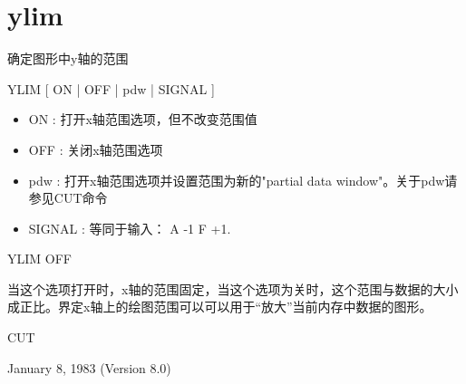 \section{ylim}
\label{cmd:ylim}

确定图形中y轴的范围

YLIM [ ON | OFF | pdw | SIGNAL ]

\begin{itemize}
\item ON : 打开x轴范围选项，但不改变范围值 
\item OFF : 关闭x轴范围选项 
\item pdw : 打开x轴范围选项并设置范围为新的"partial data window"。关于pdw请参见CUT命令 
\item SIGNAL : 等同于输入： A -1 F +1. 
\end{itemize}

YLIM OFF

当这个选项打开时，x轴的范围固定，当这个选项为关时，这个范围与数据的大小成正比。界定x轴上的绘图范围可以可以用于``放大''当前内存中数据的图形。

CUT

January 8, 1983 (Version 8.0)
